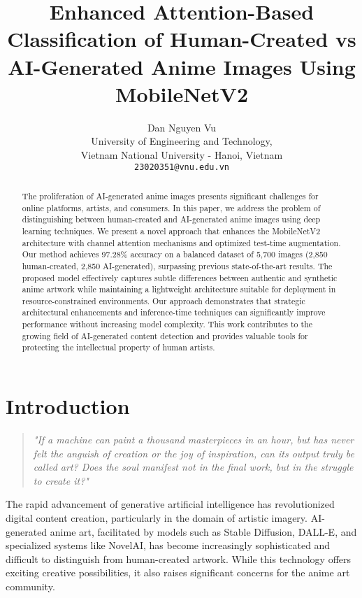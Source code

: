 \documentclass{article}
\title{Enhanced Attention-Based Classification of Human-Created vs AI-Generated Anime Images Using MobileNetV2}
\author{%
  Dan Nguyen Vu\\
  University of Engineering and Technology, \\
  Vietnam National University - Hanoi, Vietnam \\
  \texttt{23020351@vnu.edu.vn}
}
\begin{document}
\maketitle

\begin{abstract}
The proliferation of AI-generated anime images presents significant challenges for online platforms, artists, and consumers. In this paper, we address the problem of distinguishing between human-created and AI-generated anime images using deep learning techniques. We present a novel approach that enhances the MobileNetV2 architecture with channel attention mechanisms and optimized test-time augmentation. Our method achieves 97.28\% accuracy on a balanced dataset of 5,700 images (2,850 human-created, 2,850 AI-generated), surpassing previous state-of-the-art results. The proposed model effectively captures subtle differences between authentic and synthetic anime artwork while maintaining a lightweight architecture suitable for deployment in resource-constrained environments. Our approach demonstrates that strategic architectural enhancements and inference-time techniques can significantly improve performance without increasing model complexity. This work contributes to the growing field of AI-generated content detection and provides valuable tools for protecting the intellectual property of human artists.
\end{abstract}

\section{Introduction}

\begin{quotation}
\textit{"If a machine can paint a thousand masterpieces in an hour, but has never felt the anguish of creation or the joy of inspiration, can its output truly be called art? Does the soul manifest not in the final work, but in the struggle to create it?"} 
\end{quotation}



The rapid advancement of generative artificial intelligence has revolutionized digital content creation, particularly in the domain of artistic imagery. AI-generated anime art, facilitated by models such as Stable Diffusion, DALL-E, and specialized systems like NovelAI, has become increasingly sophisticated and difficult to distinguish from human-created artwork. While this technology offers exciting creative possibilities, it also raises significant concerns for the anime art community.
\end{document}
